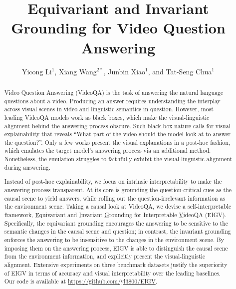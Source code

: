 \documentclass[sigconf]{acmart}
\author{Yicong Li$^{1}$, Xiang Wang$^{2*}$, Junbin Xiao$^{1}$, and Tat-Seng Chua$^1$}
\affiliation{
\institution{$^1$National University of Singapore, $^2$University of Science and Technology of China}
\country{}
}
\begin{document}

\title{Equivariant and Invariant Grounding for Video Question Answering}

\begin{abstract}
Video Question Answering (VideoQA) is the task of answering the natural language questions about a video.
Producing an answer requires understanding the interplay across visual scenes in video and linguistic semantics in question.
However, most leading VideoQA models work as black boxes, which make the visual-linguistic alignment behind the answering process obscure.
Such black-box nature calls for visual explainability that reveals ``What part of the video should the model look at to answer the question?''.
Only a few works present the visual explanations in a post-hoc fashion, which emulates the target model's answering process via an additional method.
Nonetheless, the emulation struggles to faithfully exhibit the visual-linguistic alignment during answering.

Instead of post-hoc explainability, we focus on intrinsic interpretability to make the answering process transparent.
At its core is grounding the question-critical cues as the causal scene to yield answers, while rolling out the question-irrelevant information as the environment scene.
Taking a causal look at VideoQA,
we devise a self-interpretable framework, \underline{E}quivariant and \underline{I}nvariant \underline{G}rounding for Interpretable \underline{V}ideoQA (EIGV).
Specifically, the equivariant grounding encourages the answering to be sensitive to the semantic changes in the causal scene and question; in contrast, the invariant grounding enforces the answering to be insensitive to the changes in the environment scene.
By imposing them on the answering process, EIGV is able to distinguish the causal scene from the environment information, and explicitly present the visual-linguistic alignment.
Extensive experiments on three benchmark datasets justify the superiority of EIGV in terms of accuracy and visual interpretability over the leading baselines.
Our code is available at \url{https://github.com/yl3800/EIGV}.

\end{abstract}

\end{document}

